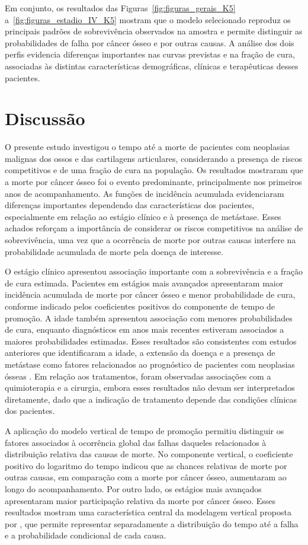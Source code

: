 \documentclass[11pt,a4paper]{article}
\begin{document}
Em conjunto, os resultados das Figuras~\ref{fig:figuras_gerais_K5} a~\ref{fig:figuras_estadio_IV_K5} mostram que o modelo selecionado reproduz os principais padrões de sobrevivência observados na amostra e permite distinguir as probabilidades de falha por câncer ósseo e por outras causas. A análise dos dois perfis evidencia diferenças importantes nas curvas previstas e na fração de cura, associadas às distintas características demográficas, clínicas e terapêuticas desses pacientes. 


\section{Discussão}

O presente estudo investigou o tempo até a morte de pacientes com neoplasias malignas dos ossos e das cartilagens articulares, considerando a presença de riscos competitivos e de uma fração de cura na população. Os resultados mostraram que a morte por câncer ósseo foi o evento predominante, principalmente nos primeiros anos de acompanhamento. As funções de incidência acumulada evidenciaram diferenças importantes dependendo das características dos pacientes, especialmente em relação ao estágio clínico e à presença de metástase. Esses achados reforçam a importância de considerar os riscos competitivos na análise de sobrevivência, uma vez que a ocorrência de morte por outras causas interfere na probabilidade acumulada de morte pela doença de interesse.

O estágio clínico apresentou associação importante com a sobrevivência e a fração de cura estimada. Pacientes em estágios mais avançados apresentaram maior incidência acumulada de morte por câncer ósseo e menor probabilidade de cura, conforme indicado pelos coeficientes positivos do componente de tempo de promoção. A idade também apresentou associação com menores probabilidades de cura, enquanto diagnósticos em anos mais recentes estiveram associados a maiores probabilidades estimadas. Esses resultados são consistentes com estudos anteriores que identificaram a idade, a extensão da doença e a presença de metástase como fatores relacionados ao prognóstico de pacientes com neoplasias ósseas \citep{duchman2015prognostic, song2018prognostic,zhou2023prognostic}. Em relação aos tratamentos, foram observadas associações com a quimioterapia e a cirurgia, embora esses resultados não devam ser interpretados diretamente, dado que a indicação de tratamento depende das condições clínicas dos pacientes.

A aplicação do modelo vertical de tempo de promoção permitiu distinguir os fatores associados à ocorrência global das falhas daqueles relacionados à distribuição relativa das causas de morte. No componente vertical, o coeficiente positivo do logaritmo do tempo indicou que as chances relativas de morte por outras causas, em comparação com a morte por câncer ósseo, aumentaram ao longo do acompanhamento. Por outro lado, os estágios mais avançados apresentaram maior participação relativa da morte por câncer ósseo. Esses resultados mostram uma característica central da modelagem vertical proposta por \cite{nicolaie2010vertical}, que permite representar separadamente a distribuição do tempo até a falha e a probabilidade condicional de cada causa.
\end{document}

